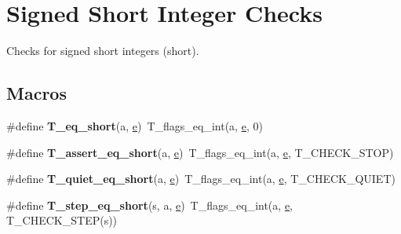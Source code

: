 \hypertarget{group__RTEMSTestFrameworkChecksShort}{}\section{Signed Short Integer Checks}
\label{group__RTEMSTestFrameworkChecksShort}


Checks for signed short integers (short).  


\subsection*{Macros}
\begin{DoxyCompactItemize}
\item 
\mbox{\label{group__RTEMSTestFrameworkChecksShort_ga90805568eb5adef9a3f94b0a8c502494}} 
\#define {\bfseries T\+\_\+eq\+\_\+short}(a,  \mbox{\hyperlink{sun4u_2tte_8h_a8b0b9ed08e0e18920ec2682f48228c27}{e}})~T\+\_\+flags\+\_\+eq\+\_\+int(a, \mbox{\hyperlink{sun4u_2tte_8h_a8b0b9ed08e0e18920ec2682f48228c27}{e}}, 0)
\item 
\mbox{\label{group__RTEMSTestFrameworkChecksShort_ga4b546d7e3c5cb304568862c83eb1316c}} 
\#define {\bfseries T\+\_\+assert\+\_\+eq\+\_\+short}(a,  \mbox{\hyperlink{sun4u_2tte_8h_a8b0b9ed08e0e18920ec2682f48228c27}{e}})~T\+\_\+flags\+\_\+eq\+\_\+int(a, \mbox{\hyperlink{sun4u_2tte_8h_a8b0b9ed08e0e18920ec2682f48228c27}{e}}, T\+\_\+\+C\+H\+E\+C\+K\+\_\+\+S\+T\+OP)
\item 
\mbox{\label{group__RTEMSTestFrameworkChecksShort_gad7be543ec7956a9f969aa95c7eea0b86}} 
\#define {\bfseries T\+\_\+quiet\+\_\+eq\+\_\+short}(a,  \mbox{\hyperlink{sun4u_2tte_8h_a8b0b9ed08e0e18920ec2682f48228c27}{e}})~T\+\_\+flags\+\_\+eq\+\_\+int(a, \mbox{\hyperlink{sun4u_2tte_8h_a8b0b9ed08e0e18920ec2682f48228c27}{e}}, T\+\_\+\+C\+H\+E\+C\+K\+\_\+\+Q\+U\+I\+ET)
\item 
\mbox{\label{group__RTEMSTestFrameworkChecksShort_gab651e61ac20a71f776f7b8b557741d7c}} 
\#define {\bfseries T\+\_\+step\+\_\+eq\+\_\+short}(s,  a,  \mbox{\hyperlink{sun4u_2tte_8h_a8b0b9ed08e0e18920ec2682f48228c27}{e}})~T\+\_\+flags\+\_\+eq\+\_\+int(a, \mbox{\hyperlink{sun4u_2tte_8h_a8b0b9ed08e0e18920ec2682f48228c27}{e}}, T\+\_\+\+C\+H\+E\+C\+K\+\_\+\+S\+T\+EP(s))

\end{DoxyCompactItemize}
